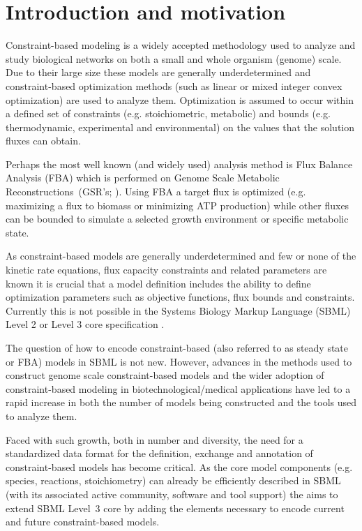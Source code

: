 
\section{ Introduction and motivation } \label{intro}

Constraint-based modeling is a widely accepted methodology used to
analyze and study biological networks on both a small and whole organism
(genome) scale. Due to their large size these models are generally underdetermined and constraint-based optimization methods (such as linear or mixed integer convex optimization) are used to analyze them. Optimization is assumed to occur within a defined set of constraints (e.g. stoichiometric, metabolic) and bounds (e.g. thermodynamic, experimental and environmental) on the values that the solution fluxes can obtain.

Perhaps the most well known (and widely used) analysis method is Flux
Balance Analysis (FBA) which is performed on Genome Scale Metabolic Reconstructions~(GSR's; \citealt{oberhardt_2009}). Using FBA a
target flux is optimized (e.g. maximizing a flux to biomass or
minimizing ATP production) while other fluxes can be bounded to simulate
a selected growth environment or specific metabolic state.

As constraint-based models are generally underdetermined and few or
none of the kinetic rate equations, flux capacity constraints and related parameters are known it is crucial that a model definition includes the ability to define optimization parameters such as objective functions, flux bounds and constraints. Currently this is not possible in the Systems Biology
Markup Language (SBML) Level 2 or Level 3 core specification
\citep{sbml, sbml3core}.

The question of how to encode constraint-based (also referred to as
steady state or FBA) models in SBML is not new. However, advances in the
methods used to construct genome scale constraint-based models and the
wider adoption of constraint-based modeling in biotechnological/medical
applications have led to a rapid increase in both the number of models
being constructed and the tools used to analyze them.

Faced with such growth, both in number and diversity, the need for a
standardized data format for the definition, exchange and annotation of
constraint-based models has become critical. As the core model
components (e.g. species, reactions, stoichiometry) can already be
efficiently described in SBML (with its associated active community,
software and tool support) the \FBCPackage aims to extend SBML Level~3
core by adding the elements necessary to encode current and future
constraint-based models.

